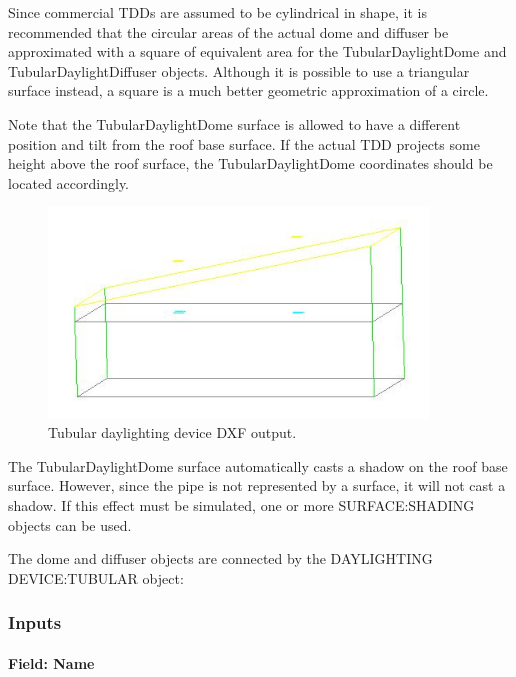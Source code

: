 Since commercial TDDs are assumed to be cylindrical in shape, it is recommended that the circular areas of the actual dome and diffuser be approximated with a square of equivalent area for the TubularDaylightDome and TubularDaylightDiffuser objects. Although it is possible to use a triangular surface instead, a square is a much better geometric approximation of a circle.

Note that the TubularDaylightDome surface is allowed to have a different position and tilt from the roof base surface. If the actual TDD projects some height above the roof surface, the TubularDaylightDome coordinates should be located accordingly.

\begin{figure}[hbtp] %
\centering
\includegraphics[width=0.9\textwidth, height=0.9\textheight, keepaspectratio=true]{media/image109.png}
\caption{Tubular daylighting device DXF output. \protect \label{fig:tubular-daylighting-device-dxf-output.}}
\end{figure}

The TubularDaylightDome surface automatically casts a shadow on the roof base surface. However, since the pipe is not represented by a surface, it will not cast a shadow. If this effect must be simulated, one or more SURFACE:SHADING objects can be used.

The dome and diffuser objects are connected by the DAYLIGHTING DEVICE:TUBULAR object:

\subsubsection{Inputs}\label{inputs-6-005}

\paragraph{Field: Name}\label{field-name-3-007}

